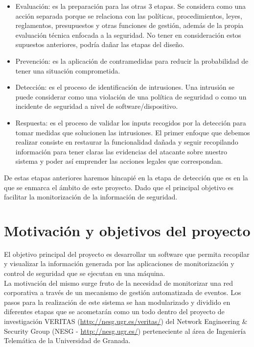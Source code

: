 \begin{itemize}
\item Evaluación: es la preparación para las otras 3 etapas. Se considera como una acción separada porque se relaciona con las políticas, procedimientos, leyes, reglamentos, presupuestos y otras funciones de gestión, además de la propia evaluación técnica enfocada a la seguridad. No tener en consideración estos supuestos anteriores, podría dañar las etapas del diseño.
\item Prevención: es la aplicación de contramedidas para reducir la probabilidad de tener una situación comprometida.
\item Detección: es el proceso de identificación de intrusiones. Una intrusión se puede considerar como una violación de una política de seguridad o como un incidente de seguridad a nivel de software/dispositivo.
\item Respuesta: es el proceso de validar los inputs recogidos por la detección para tomar medidas que solucionen las intrusiones. El primer enfoque que debemos realizar consiste en restaurar la funcionalidad dañada y seguir recopilando información para tener claras las evidencias del atacante sobre nuestro sistema y poder así emprender las acciones legales que correspondan.
\end{itemize}

De estas etapas anteriores haremos hincapié en la etapa de detección que es en la que se enmarca el ámbito de este proyecto. Dado que el principal objetivo es facilitar la monitorización de la información de seguridad.

\section{Motivación y objetivos del proyecto}

El objetivo principal del proyecto es desarrollar un software que permita recopilar y visualizar la información generada por las aplicaciones de monitorización y control de seguridad que se ejecutan en una máquina.\\

La motivación del mismo surge fruto de la necesidad de monitorizar una red corporativa a través de un mecanismo de gestión automatizada de eventos. Los pasos para la realización de este sistema se han modularizado y dividido en diferentes etapas que se acometarán como un todo dentro del proyecto de investigación VERITAS (\url{http://nesg.ugr.es/veritas/}) del Network Engineering \& Security Group (NESG - \url{http://nesg.ugr.es/}) perteneciente al área de Ingeniería Telemática de la Universidad de Granada.\\

